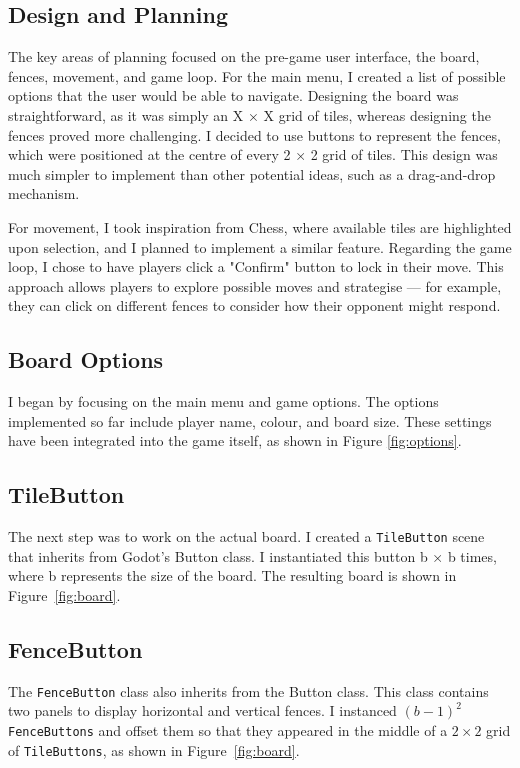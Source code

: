 \documentclass[progress]{cmpreport}
\begin{document}
\subsection{Design and Planning}
The key areas of planning focused on the pre-game user interface, the board, fences, movement, and game loop. For the main menu, I created a list of possible options that the user would be able to navigate. Designing the board was straightforward, as it was simply an X × X grid of tiles, whereas designing the fences proved more challenging. I decided to use buttons to represent the fences, which were positioned at the centre of every 2 × 2 grid of tiles. This design was much simpler to implement than other potential ideas, such as a drag-and-drop mechanism.

\noindent For movement, I took inspiration from Chess, where available tiles are highlighted upon selection, and I planned to implement a similar feature. Regarding the game loop, I chose to have players click a "Confirm" button to lock in their move. This approach allows players to explore possible moves and strategise — for example, they can click on different fences to consider how their opponent might respond.

\subsection{Board Options}
I began by focusing on the main menu and game options. The options implemented so far include player name, colour, and board size. These settings have been integrated into the game itself, as shown in Figure \ref{fig:options}.

\subsection{TileButton}
The next step was to work on the actual board. I created a \texttt{TileButton} scene that inherits from Godot's Button class. I instantiated this button b × b times, where b represents the size of the board. The resulting board is shown in Figure~\ref{fig:board}.

\subsection{FenceButton}
The \texttt{FenceButton} class also inherits from the Button class. This class contains two panels to display horizontal and vertical fences. I instanced \((b-1)^2\) \texttt{FenceButtons} and offset them so that they appeared in the middle of a \(2 \times 2\) grid of \texttt{TileButtons}, as shown in Figure~\ref{fig:board}.
\end{document}
